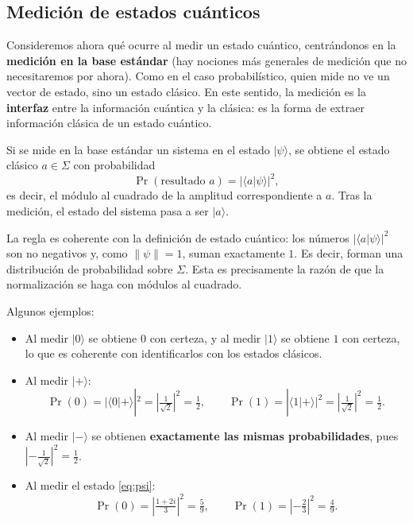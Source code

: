 \documentclass[11pt, a4paper, twoside, openright]{report}
\begin{document}
\subsection{Medición de estados cuánticos}

\noindent Consideremos ahora qué ocurre al medir un estado cuántico, centrándonos en la \textbf{medición en la base estándar} (hay nociones más generales de medición que no necesitaremos por ahora). Como en el caso probabilístico, quien mide no ve un vector de estado, sino un estado clásico. En este sentido, la medición es la \textbf{interfaz} entre la información cuántica y la clásica: es la forma de extraer información clásica de un estado cuántico.

\begin{tcolorbox}[colback=teal!5!white,colframe=teal!75!black,title=\textbf{Regla de Born}]
Si se mide en la base estándar un sistema en el estado $|\psi\rangle$, se obtiene el estado clásico $a \in \Sigma$ con probabilidad
\[ \Pr(\text{resultado } a) = |\langle a|\psi\rangle|^2, \]
es decir, el módulo al cuadrado de la amplitud correspondiente a $a$. Tras la medición, el estado del sistema pasa a ser $|a\rangle$.
\end{tcolorbox}

\noindent La regla es coherente con la definición de estado cuántico: los números $|\langle a|\psi\rangle|^2$ son no negativos y, como $\|\psi\| = 1$, suman exactamente $1$. Es decir, forman una distribución de probabilidad sobre $\Sigma$. Esta es precisamente la razón de que la normalización se haga con módulos al cuadrado.

\noindent Algunos ejemplos:
\begin{itemize}
    \item Al medir $|0\rangle$ se obtiene $0$ con certeza, y al medir $|1\rangle$ se obtiene $1$ con certeza, lo que es coherente con identificarlos con los estados clásicos.
    \item Al medir $|+\rangle$:
    \[ \Pr(0) = |\langle 0|+\rangle|^2 = \left|\tfrac{1}{\sqrt 2}\right|^2 = \tfrac12, \qquad \Pr(1) = |\langle 1|+\rangle|^2 = \left|\tfrac{1}{\sqrt 2}\right|^2 = \tfrac12. \]
    \item Al medir $|-\rangle$ se obtienen \textbf{exactamente las mismas probabilidades}, pues $\left|-\tfrac{1}{\sqrt 2}\right|^2 = \tfrac12$.
    \item Al medir el estado \eqref{eq:psi}:
    \[ \Pr(0) = \left|\tfrac{1+2i}{3}\right|^2 = \tfrac59, \qquad \Pr(1) = \left|-\tfrac23\right|^2 = \tfrac49. \]
\end{itemize}
\end{document}
